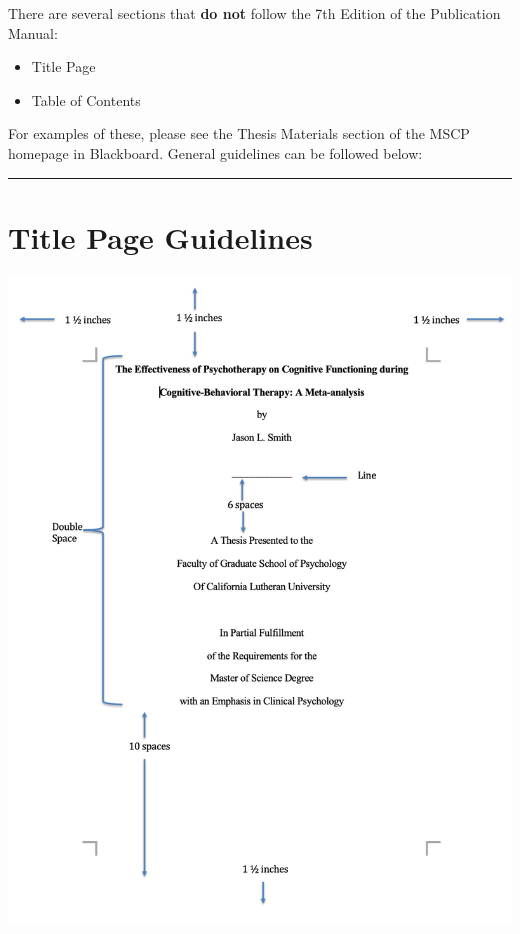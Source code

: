 \documentclass[openany]{book}
\providecommand{\tightlist}{%
  \setlength{\itemsep}{0pt}\setlength{\parskip}{0pt}}
\begin{document}
There are several sections that \textbf{do not} follow the 7th Edition of the Publication Manual:

\begin{itemize}
\tightlist
\item
  Title Page
\item
  Table of Contents
\end{itemize}

For examples of these, please see the Thesis Materials section of the MSCP homepage in Blackboard. General guidelines can be followed below:

\begin{center}\rule{0.5\linewidth}{0.5pt}\end{center}

\hypertarget{title-page-guidelines}{%
\section{Title Page Guidelines}\label{title-page-guidelines}}

\includegraphics[width=13.33in]{images/titlepage}
\end{document}

